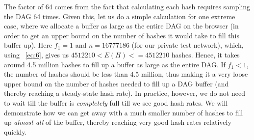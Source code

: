 \documentclass[runningheads]{llncs}
\newcommand{\trishita}[1]{{\color{magenta}\bfseries[Trishita: #1]}}
\begin{document}
The factor of 64 comes from the fact that calculating each hash requires sampling the DAG 64 times. Given this, let us do a simple calculation for one extreme case, where we allocate a buffer as large as the entire DAG on the browser (in order to get an upper bound on the number of hashes it would take to fill this buffer up). Here $f_1 = 1$ and $n = 16777186$ (for our private test network), which, using ~\ref{eq:6}, gives us $4512210 < E(H) <= 4512210$ hashes. Hence, it takes around 4.5 million hashes to fill up a buffer as large as the entire DAG. If $f_1 < 1$, the number of hashes should be less than 4.5 million, thus making it a very loose upper bound on the number of hashes needed to fill up a DAG buffer (and thereby reaching a steady-state hash rate). 
In practice, however, we do not need to wait till the buffer is \emph{completely} full till we see good hash rates. We will demonstrate how we can get away with a much smaller number of hashes to fill up \emph{almost all} of the buffer, thereby reaching very good hash rates relatively quickly.
\end{document}
